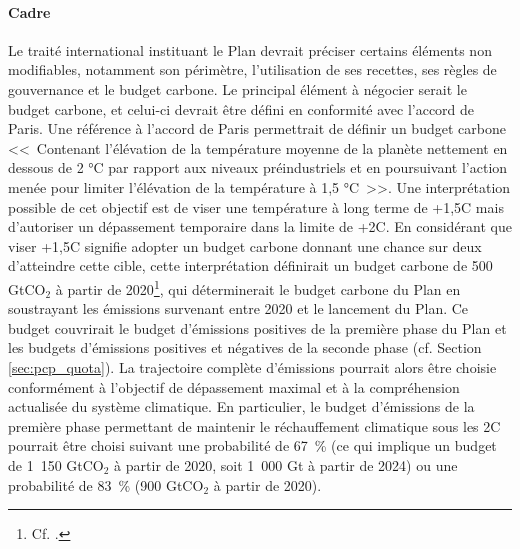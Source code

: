 \documentclass[a5paper,french,openany]{memoir}
\begin{document}
\paragraph{Cadre} %
Le traité international instituant le Plan devrait préciser certains éléments non modifiables, notamment son périmètre, l'utilisation de ses recettes, ses règles de gouvernance et le budget carbone. Le principal élément à négocier serait le budget carbone, et celui-ci devrait être défini en conformité avec l'accord de Paris. Une référence à l'accord de Paris permettrait de définir un budget carbone <<~Contenant l'élévation de la température moyenne de la planète nettement en dessous de 2 °C par rapport aux niveaux préindustriels et en poursuivant l'action menée pour limiter l'élévation de la température à 1,5 °C~>>. Une interprétation possible de cet objectif est de viser une température à long terme de +1,5\textdegree{}C mais d'autoriser un dépassement temporaire dans la limite de +2\textdegree{}C. 
En considérant que viser +1,5\textdegree{}C signifie adopter un budget carbone donnant une chance sur deux d'atteindre cette cible, cette interprétation définirait un budget carbone de 500 GtCO$_\text{2}$ à partir de 2020\footnote{Cf. \cite{ipcc_climate_2021}.}, 
qui déterminerait le budget carbone du Plan en soustrayant les émissions survenant entre 2020 et le lancement du Plan. Ce budget couvrirait le budget d'émissions positives de la première phase du Plan et les budgets d'émissions positives et négatives de la seconde phase (cf. Section \ref{sec:pcp_quota}). 
La trajectoire complète d'émissions %
pourrait alors être choisie conformément à l'objectif de dépassement maximal et à la compréhension actualisée du système climatique. 
En particulier, le budget d'émissions de la première phase permettant de maintenir le réchauffement climatique sous les 2\textdegree{}C pourrait être choisi suivant une probabilité de 67~\% (ce qui implique un budget de 1~150 GtCO$_\text{2}$ à partir de 2020, soit 1~000 Gt à partir de 2024) ou une probabilité de 83~\% (900 GtCO$_\text{2}$ à partir de 2020). 
\end{document}
